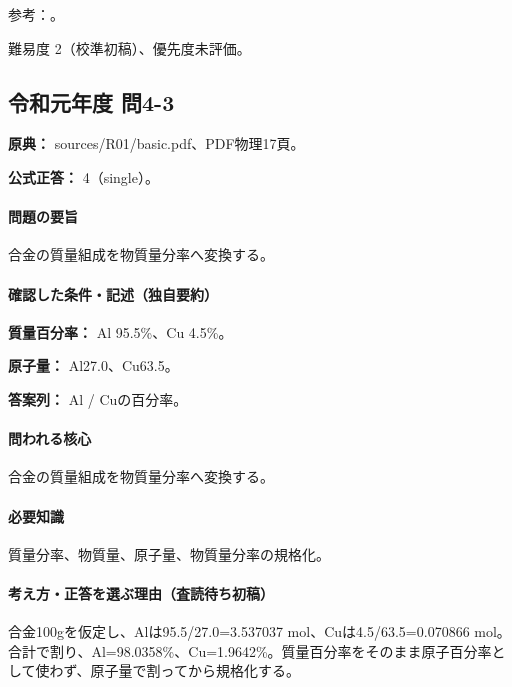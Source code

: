 \par 参考：\cite{iupac_amount_fraction}。

\par 難易度 2（校準初稿）、優先度未評価。

\subsection{令和元年度 問4-3}
\label{q:r01-reg-basic-4-3}

\noindent\textbf{原典：} sources/R01/basic.pdf、PDF物理17頁。

\textbf{公式正答：} 4（single）。

\paragraph{問題の要旨} 合金の質量組成を物質量分率へ変換する。

\paragraph{確認した条件・記述（独自要約）}\mbox{}\par

\noindent\textbf{質量百分率：} Al 95.5\%、Cu 4.5\%。\par

\noindent\textbf{原子量：} Al27.0、Cu63.5。\par

\noindent\textbf{答案列：} Al / Cuの百分率。\par

\paragraph{問われる核心} 合金の質量組成を物質量分率へ変換する。

\paragraph{必要知識} 質量分率、物質量、原子量、物質量分率の規格化。

\paragraph{考え方・正答を選ぶ理由（査読待ち初稿）} 合金100gを仮定し、Alは95.5/27.0=\allowbreak{}3.537037 mol、Cuは4.5/63.5=\allowbreak{}0.070866 mol。合計で割り、Al=\allowbreak{}98.0358\%、Cu=\allowbreak{}1.9642\%。質量百分率をそのまま原子百分率として使わず、原子量で割ってから規格化する。


